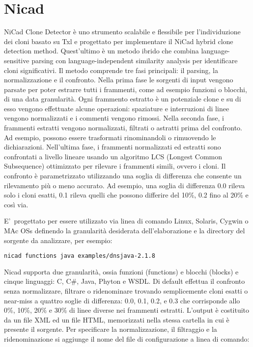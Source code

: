 \section{Nicad}
NiCad Clone Detector è uno strumento scalabile e flessibile per l'individuzione dei cloni basato su Txl e progettato per implementare il NiCad hybrid clone detection method. Quest'ultimo è un metodo ibrido che combina language-sensitive parsing con language-independent similarity analysis per identificare cloni significativi.
Il metodo comprende tre fasi principali: il parsing, la normalizzazione e il confronto.
Nella prima fase le sorgenti di input vengono parsate per poter estrarre tutti i frammenti, come ad esempio funzioni o blocchi, di una data granularità. Ogni frammento estratto è un potenziale clone e su di esso vengono effettuate alcune operazioni: spaziature e interruzioni di linee vengono normalizzati e i commenti vengono rimossi. 
Nella seconda fase, i frammenti estratti vengono normalizzati, filtrati o astratti prima del confronto. Ad esempio, possono essere trasformati rinominandoli o rimuovendo le dichiarazioni.
Nell'ultima fase, i frammenti normalizzati ed estratti sono confrontati a livello lineare usando un algoritmo LCS (Longest Common Subsequence) ottimizzato per rilevare i frammenti simili, ovvero i cloni. Il confronto è parametrizzato utilizzando una soglia di differenza che consente un rilevamento più o meno accurato. Ad esempio, una soglia di differenza 0.0 rileva solo i cloni esatti, 0.1 rileva quelli che possono differire del 10\%, 0.2 fino al 20\% e così via.

E'\ progettato per essere utilizzato via linea di comando Linux, Solaris, Cygwin o MAc OSs definendo la granularità desiderata dell'elaborazione e la directory del sorgente da analizzare, per esempio: 

\begin{center}
\verb|nicad functions java examples/dnsjava-2.1.8|
\end{center}

Nicad supporta due granularità, ossia funzioni (functions) e blocchi (blocks) e cinque linguaggi: C, C\#, Java, Phyton e WSDL.
Di default effettua il confronto senza normalizzare, filtrare o ridenominare trovando semplicemente cloni esatti o near-miss a quattro soglie di differenza: 0.0, 0.1, 0.2, e 0.3 che corrisponde allo 0\%, 10\%, 20\% e 30\% di linee diverse nei frammenti estratti.
L'output è costituito da un file XML ed un file HTML, memorizzati nella stessa cartella in cui è presente il sorgente. 
Per specificare la normalizzazione, il filtraggio e la ridenominazione si aggiunge il nome del file di configurazione a linea di comando:

